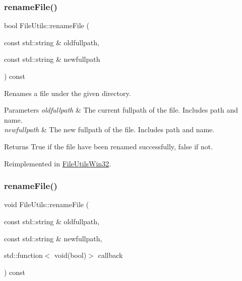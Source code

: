 \subsubsection{\texorpdfstring{rename\+File()}{renameFile()}\hspace{0.1cm}{\footnotesize\ttfamily [5/6]}}
{\footnotesize\ttfamily bool File\+Utils\+::rename\+File (\begin{DoxyParamCaption}\item[{const std\+::string \&}]{oldfullpath,  }\item[{const std\+::string \&}]{newfullpath }\end{DoxyParamCaption}) const\hspace{0.3cm}{\ttfamily [virtual]}}

Renames a file under the given directory.


\begin{DoxyParams}{Parameters}
{\em oldfullpath} & The current fullpath of the file. Includes path and name. \\
\hline
{\em newfullpath} & The new fullpath of the file. Includes path and name. \\
\hline
\end{DoxyParams}
\begin{DoxyReturn}{Returns}
True if the file have been renamed successfully, false if not. 
\end{DoxyReturn}


Reimplemented in \hyperlink{classFileUtilsWin32_a1c948c39348ea2a7b88cc232b96e3f68}{File\+Utils\+Win32}.

\mbox{\label{classFileUtils_a50eae0c881fdb024de1be74e315db3b9}} 
\subsubsection{\texorpdfstring{rename\+File()}{renameFile()}\hspace{0.1cm}{\footnotesize\ttfamily [6/6]}}
{\footnotesize\ttfamily void File\+Utils\+::rename\+File (\begin{DoxyParamCaption}\item[{const std\+::string \&}]{oldfullpath,  }\item[{const std\+::string \&}]{newfullpath,  }\item[{std\+::function$<$ void(bool)$>$}]{callback }\end{DoxyParamCaption}) const\hspace{0.3cm}{\ttfamily [virtual]}}

